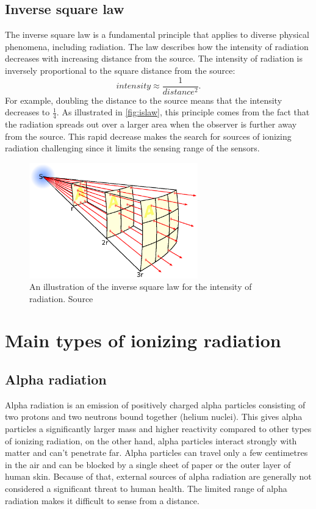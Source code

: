 \subsection{Inverse square law}%
The inverse square law is a fundamental principle that applies to diverse physical phenomena, including radiation.
The law describes how the intensity of radiation decreases with increasing distance from the source.
The intensity of radiation is inversely proportional to the square distance from the source:
\begin{equation}
  intensity \approx \frac{1}{distance^2}.
\end{equation}
For example, doubling the distance to the source means that the intensity decreases to $\frac{1}{4}$.
As illustrated in \autoref{fig:islaw}, this principle comes from the fact that the radiation spreads out over a larger area when the observer is further away from the source.
This rapid decrease makes the search for sources of ionizing radiation challenging since it limits the sensing range of the sensors.

  \begin{figure}[!h]
    \centering
      \includegraphics[width=0.65\textwidth]{./fig/photos/Inverse_square_law.eps}
    \caption{An illustration of the inverse square law for the intensity of radiation. Source\protect\footnotemark }%
      \label{fig:islaw}
  \end{figure}
\section{Main types of ionizing radiation}
\subsection{Alpha radiation}
Alpha radiation is an emission of positively charged alpha particles consisting of two protons and two neutrons bound together (helium nuclei).
This gives alpha particles a significantly larger mass and higher reactivity compared to other types of ionizing radiation, on the other hand, alpha particles interact strongly with matter and can't penetrate far.
Alpha particles can travel only a few centimetres in the air and can be blocked by a single sheet of paper or the outer layer of human skin.
Because of that, external sources of alpha radiation are generally not considered a significant threat to human health.
The limited range of alpha radiation makes it difficult to sense from a distance.

